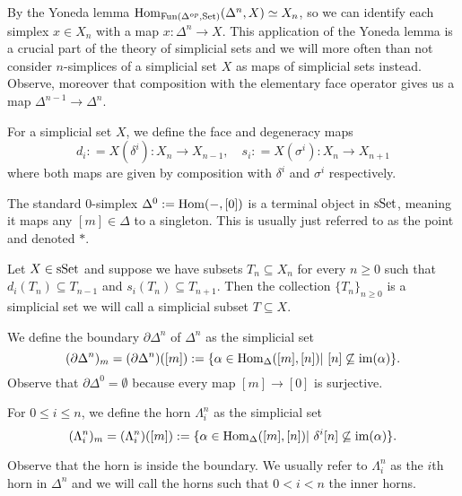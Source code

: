 \documentclass[../../thesis.tex]{subfiles}
\begin{document}
By the Yoneda lemma $\mathrm{Hom}_{\mathrm{Fun}(\Delta^{op}, \mathrm{Set})}(\Delta^n, X) \simeq X_n$, so we can identify each simplex $x\in X_n$ with a map $x:\Delta^n\to X$.
This application of the Yoneda lemma is a crucial part of the theory of simplicial sets and we will more often than not consider $n$-simplices of a simplicial set $X$ as maps of simplicial sets instead.
Observe, moreover that composition with the elementary face operator gives us a map $\Delta^{n-1}\to\Delta^n$.
\begin{definition}
    For a simplicial set $X$, we define the face and degeneracy maps
    \[
        d_i: = X(\delta^i): X_{n} \to X_{n-1}, \quad s_i: = X(\sigma^i): X_{n} \to X_{n+1}
    \]
    where both maps are given by composition with $\delta^i$ and $\sigma^i$ respectively.
\end{definition}
\begin{example}
    The standard $0$-simplex $\Delta^0:=\mathrm{Hom}({-}, [0])$ is a terminal object in $\mathrm{sSet}$, meaning it maps any $[m]\in \Delta$ to a singleton.
    This is usually just referred to as the point and denoted $*$.
\end{example}
\begin{example}
    Let $X \in \mathrm{sSet}$ and suppose we have subsets $T_n\subseteq X_n$ for every $n\geq 0$ such that $d_i(T_n)\subseteq T_{n-1}$ and $s_i(T_n) \subseteq T_{n+1}$.
    Then the collection $\{T_n\}_{n\geq 0}$ is a simplicial set we will call a simplicial subset $T\subseteq X$.
\end{example}
\begin{definition}
    We define the boundary $\partial\Delta^n$ of $\Delta^n$ as the simplicial set
    \[
        (\partial\Delta^n)_m = (\partial\Delta^n)([m]) :=\{\alpha \in \Hom_{\Delta}([m], [n]) | [n] \not\subseteq \mathrm{im}(\alpha)\}.
    \]
    Observe that $\partial\Delta^0=\emptyset$ because every map $[m] \to [0]$ is surjective.
\end{definition}
\begin{definition}
    For $0\leq i \leq n$, we define the horn $\Lambda_i^n$ as the simplicial set
    \[
        (\Lambda_i^n)_m =(\Lambda_i^n)([m]) :=\{\alpha \in \Hom_{\Delta}([m], [n]) | \delta^i[n] \not\subseteq \mathrm{im}(\alpha)\}.
    \]
\end{definition}
Observe that the horn is inside the boundary.
We usually refer to $\Lambda_i^n$ as the $i$th horn in $\Delta^n$ and we will call the horns such that $0<i<n$ the inner horns.
\end{document}
